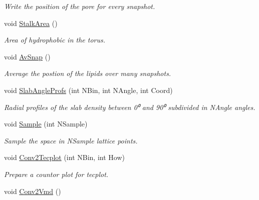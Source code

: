 \begin{DoxyCompactItemize}
\begin{DoxyCompactList}\small\item\em \-Write the position of the pore for every snapshot. \end{DoxyCompactList}\item 
void \hyperlink{classElPoly_a099625012512857cb5524bf15b397e5e}{\-Stalk\-Area} ()
\begin{DoxyCompactList}\small\item\em \-Area of hydrophobic in the torus. \end{DoxyCompactList}\item 
\hypertarget{classElPoly_aafe33ef0f28995ba7c1a778196decf9b}{void \hyperlink{classElPoly_aafe33ef0f28995ba7c1a778196decf9b}{\-Av\-Snap} ()}\label{classElPoly_aafe33ef0f28995ba7c1a778196decf9b}

\begin{DoxyCompactList}\small\item\em \-Average the postion of the lipids over many snapshots. \end{DoxyCompactList}\item 
void \hyperlink{classElPoly_a4192d526e79a4c1e0b4910a4f35720c4}{\-Slab\-Angle\-Profs} (int \-N\-Bin, int \-N\-Angle, int \-Coord)
\begin{DoxyCompactList}\small\item\em \-Radial profiles of the slab density between 0⁰ and 90⁰ subdivided in \-N\-Angle angles. \end{DoxyCompactList}\item 
\hypertarget{classElPoly_ada9b9ef0fea961264425fae43e3a4391}{void \hyperlink{classElPoly_ada9b9ef0fea961264425fae43e3a4391}{\-Sample} (int \-N\-Sample)}\label{classElPoly_ada9b9ef0fea961264425fae43e3a4391}

\begin{DoxyCompactList}\small\item\em \-Sample the space in \-N\-Sample lattice points. \end{DoxyCompactList}\item 
\hypertarget{classElPoly_ab03f8f580a4b45968aedcaa0d088c469}{void \hyperlink{classElPoly_ab03f8f580a4b45968aedcaa0d088c469}{\-Conv2\-Tecplot} (int \-N\-Bin, int \-How)}\label{classElPoly_ab03f8f580a4b45968aedcaa0d088c469}

\begin{DoxyCompactList}\small\item\em \-Prepare a countor plot for tecplot. \end{DoxyCompactList}\item 
\hypertarget{classElPoly_a552193e7b9dea6d667fc1cd2ecab1482}{void \hyperlink{classElPoly_a552193e7b9dea6d667fc1cd2ecab1482}{\-Conv2\-Vmd} ()}\label{classElPoly_a552193e7b9dea6d667fc1cd2ecab1482}


\end{DoxyCompactItemize}
